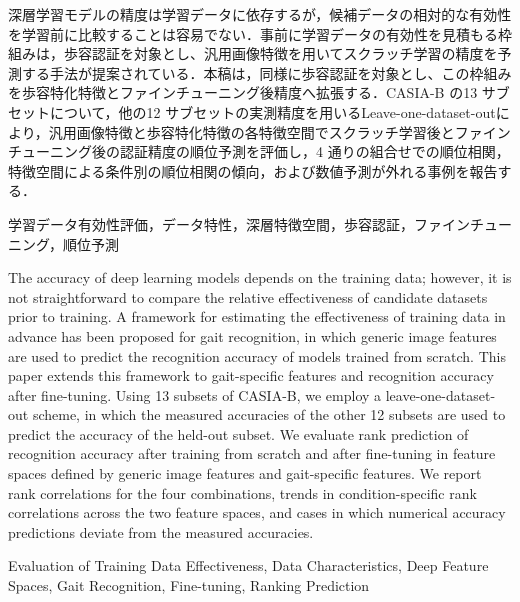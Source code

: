 \documentclass[technicalreport]{ieicej}
\begin{document}
\begin{jabstract}
深層学習モデルの精度は学習データに依存するが，候補データの相対的な有効性を学習前に比較することは容易でない．事前に学習データの有効性を見積もる枠組みは，歩容認証を対象とし、汎用画像特徴を用いてスクラッチ学習の精度を予測する手法が提案されている．本稿は，同様に歩容認証を対象とし、この枠組みを歩容特化特徴とファインチューニング後精度へ拡張する．CASIA-B の13 サブセットについて，他の12 サブセットの実測精度を用いるLeave-one-dataset-outにより，汎用画像特徴と歩容特化特徴の各特徴空間でスクラッチ学習後とファインチューニング後の認証精度の順位予測を評価し，4 通りの組合せでの順位相関，特徴空間による条件別の順位相関の傾向，および数値予測が外れる事例を報告する．
\end{jabstract}
\begin{jkeyword}
学習データ有効性評価，データ特性，深層特徴空間，歩容認証，ファインチューニング，順位予測
\end{jkeyword}
\begin{eabstract}
The accuracy of deep learning models depends on the training data; however, it is not straightforward to compare the relative effectiveness of candidate datasets prior to training. A framework for estimating the effectiveness of training data in advance has been proposed for gait recognition, in which generic image features are used to predict the recognition accuracy of models trained from scratch. This paper extends this framework to gait-specific features and recognition accuracy after fine-tuning. Using 13 subsets of CASIA-B, we employ a leave-one-dataset-out scheme, in which the measured accuracies of the other 12 subsets are used to predict the accuracy of the held-out subset. We evaluate rank prediction of recognition accuracy after training from scratch and after fine-tuning in feature spaces defined by generic image features and gait-specific features. We report rank correlations for the four combinations, trends in condition-specific rank correlations across the two feature spaces, and cases in which numerical accuracy predictions deviate from the measured accuracies.
\end{eabstract}
\begin{ekeyword}
Evaluation of Training Data Effectiveness, Data Characteristics, Deep Feature Spaces, Gait Recognition, Fine-tuning, Ranking Prediction
\end{ekeyword}
\maketitle
\end{document}
